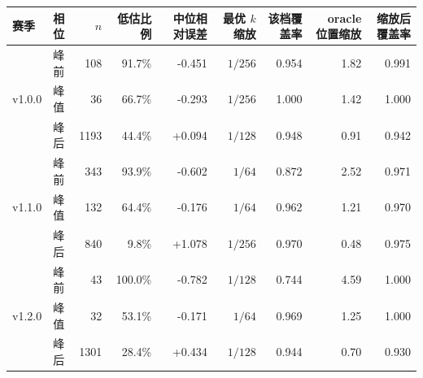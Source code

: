 \begin{tabular}{@{}llrrrrrrr@{}}
\toprule
赛季 & 相位 & $n$ & 低估比例 & 中位相对误差 & 最优 $k$ 缩放 & 该档覆盖率 & oracle 位置缩放 & 缩放后覆盖率 \\
\midrule
\multirow{3}{*}{v1.0.0} & 峰前 & 108 & 91.7\% & -0.451 & $1/256$ & 0.954 & 1.82 & 0.991 \\
 & 峰值 & 36 & 66.7\% & -0.293 & $1/256$ & 1.000 & 1.42 & 1.000 \\
 & 峰后 & 1193 & 44.4\% & +0.094 & $1/128$ & 0.948 & 0.91 & 0.942 \\
\midrule
\multirow{3}{*}{v1.1.0} & 峰前 & 343 & 93.9\% & -0.602 & $1/64$ & 0.872 & 2.52 & 0.971 \\
 & 峰值 & 132 & 64.4\% & -0.176 & $1/64$ & 0.962 & 1.21 & 0.970 \\
 & 峰后 & 840 & 9.8\% & +1.078 & $1/256$ & 0.970 & 0.48 & 0.975 \\
\midrule
\multirow{3}{*}{v1.2.0} & 峰前 & 43 & 100.0\% & -0.782 & $1/128$ & 0.744 & 4.59 & 1.000 \\
 & 峰值 & 32 & 53.1\% & -0.171 & $1/64$ & 0.969 & 1.25 & 1.000 \\
 & 峰后 & 1301 & 28.4\% & +0.434 & $1/128$ & 0.944 & 0.70 & 0.930 \\
\bottomrule
\end{tabular}
